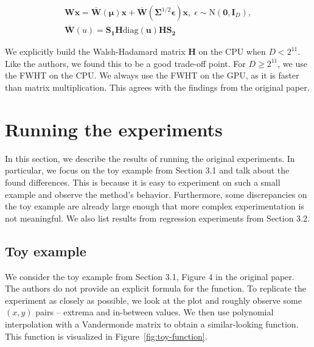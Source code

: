 \documentclass[11pt, twocolumn]{article}
\begin{document}
    \begin{align}
        \mathbf{W}\mathbf{x} = \overline{\mathbf{W}}(\mathbf{\mu})\mathbf{x} + \overline{\mathbf{W}}(\mathbf{\Sigma}^{1/2}\mathbf{\epsilon})\mathbf{x}, \; \epsilon \sim \mathrm{N}(\mathbf{0}, \mathbf{I}_D)\label{eqn:lrt1},\\
        \overline{\mathbf{W}}(u) = \mathbf{S_1} \mathbf{H} \mathrm{diag}(\mathbf{u}) \mathbf{H} \mathbf{S_2}\label{eqn:lrt2}
    \end{align}

    We explicitly build the Walsh-Hadamard matrix $\mathbf{H}$ on the CPU when $D < 2^{11}$.
    Like the authors, we found this to be a good trade-off point.
    For $D \ge 2^{11}$, we use the FWHT on the CPU.
    We always use the FWHT on the GPU, as it is faster than matrix multiplication.
    This agrees with the findings from the original paper.

    \section{Running the experiments}\label{sec:running-the-experiments}
    In this section, we describe the results of running the original experiments.
    In particular, we focus on the toy example from Section 3.1 and talk about the found differences.
    This is because it is easy to experiment on such a small example and observe the method's behavior.
    Furthermore, some discrepancies on the toy example are already large enough that more complex experimentation is not meaningful.
    We also list results from regression experiments from Section 3.2.

    \subsection{Toy example}\label{sec:toy-example}
    We consider the toy example from Section 3.1, Figure 4 in the original paper.
    The authors do not provide an explicit formula for the function.
    To replicate the experiment as closely as possible, we look at the plot and roughly observe some $(x, y)$ pairs -- extrema and in-between values.
    We then use polynomial interpolation with a Vandermonde matrix to obtain a similar-looking function.
    This function is visualized in Figure~\ref{fig:toy-function}.
\end{document}
